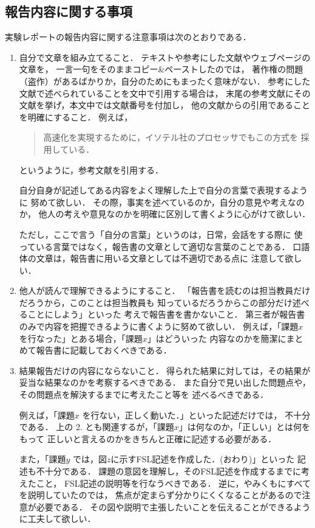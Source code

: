 \documentclass{jarticle}[11pt]
\begin{document}
\subsection{報告内容に関する事項}
実験レポートの報告内容に関する注意事項は次のとおりである．
\begin{enumerate}
\item 自分で文章を組み立てること．
テキストや参考にした文献やウェブページの文章を，
一言一句をそのままコピー\&ペーストしたのでは，
著作権の問題（盗作）があるばかりか，自分のためにもまったく意味がない．
参考にした文献で述べられていることを文中で引用する場合は，
末尾の参考文献にその文献を挙げ，本文中では文献番号を付加し，
他の文献からの引用であることを明確にすること．
例えば，
\begin{quote}
高速化を実現するために，イソテル社のプロセッサでもこの方式を
採用している\cite{bib:超高速プロセッサ}．
\end{quote}
というように，参考文献を引用する．

自分自身が記述してある内容を{\gt よく理解した上で自分の言葉で表現する}ように
努めて欲しい．
その際，事実を述べているのか，自分の意見や考えなのか，
他人の考えや意見なのかを明確に区別して書くように心がけて欲しい．

ただし，ここで言う「自分の言葉」というのは，日常，会話をする際に
使っている言葉ではなく，報告書の文章として適切な言葉のことである．
{\gt 口語体の文章は，報告書に用いる文章としては不適切}である点に
注意して欲しい．

\item 他人が読んで理解できるようにすること．
「報告書を読むのは担当教員だけだろうから，このことは担当教員も
知っているだろうからこの部分だけ述べることにしよう」といった
考えで報告書を書かないこと．
第三者が報告書のみで内容を把握できるように書くように努めて欲しい．
例えば，「課題$x$を行なった」とある場合，「課題$x$」はどういった
内容なのかを{\gt 簡潔にまとめて}報告書に記載しておくべきである．

\item 結果報告だけの内容にならないこと．
得られた結果に対しては，その結果が妥当な結果なのかを考察するべきである．
また自分で見い出した問題点や，その問題点を解決するまでに考えたこと等を
述べるべきである．

例えば，「課題$x$ を行ない，正しく動いた．」といった記述だけでは，
不十分である．
上の 2. とも関連するが，「課題$x$」は何なのか，「正しい」とは何をもって
正しいと言えるのかをきちんと正確に記述する必要がある．

また，「課題$y$ では，図$z$に示すFSL記述を作成した．(おわり)」といった
記述も不十分である．
課題の意図を理解し，そのFSL記述を作成するまでに考えたこと，
FSL記述の説明等を行なうべきである．
逆に，やみくもにすべてを説明していたのでは，
焦点が定まらず分かりにくくなることがあるので注意が必要である．
その図や説明で主張したいことを伝えることができるように工夫して欲しい．
\end{enumerate}
\end{document}
